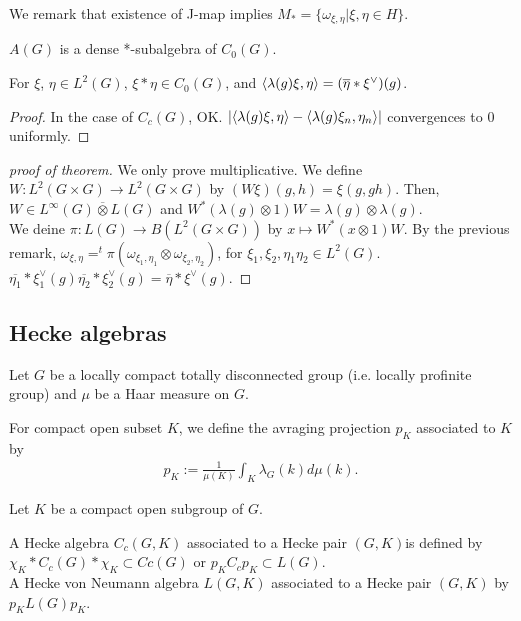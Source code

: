 We remark that existence of J-map implies $M_* = \{\omega_{\xi,\eta}|\xi, \eta \in H\}$.


\begin{theorem}
  $A(G)$ is a dense *-subalgebra of $C_0(G)$.
\end{theorem}

\begin{lemma}
  For $\xi$, $\eta \in L^2(G)$, $\xi*\eta \in C_0(G)$, and $\langle\lambda(g)\xi,\eta\rangle = (\overline{\eta}*\xi^{\vee})(g)$.
\end{lemma}

\begin{proof}
  In the case of $C_c(G)$, OK.
  $|\langle\lambda(g)\xi, \eta\rangle - \langle\lambda(g)\xi_n, \eta_n\rangle|$ convergences to $0$ uniformly.
\end{proof}

\begin{proof}[proof of theorem]
  We only prove multiplicative.
  We define $W: L^2(G \times G) \rightarrow L^2(G \times G)$ by $(W\xi)(g,h) = \xi(g,gh)$.
  Then, $W \in L^\infty(G) \overline{\otimes} L(G)$ and $W^*(\lambda(g) \otimes 1)W = \lambda(g)\otimes\lambda(g)$.\\
  We deine $\pi : L(G) \rightarrow B(L^2(G \times G))$ by $x \mapsto W^*(x\otimes1)W$.
  By the previous remark, $\omega_{\xi,\eta} = ^{t}\pi (\omega_{\xi_1,\eta_1}\otimes\omega_{\xi_2,\eta_2})$, for $\xi_1,\xi_2,\eta_1\eta_2 \in L^2(G)$.
  $\overline{\eta_1}*\xi_1^{\vee}(g)\overline{\eta_2}*\xi_2^{\vee}(g) = \overline{\eta}*\xi^{\vee}(g)$.
\end{proof}

\subsection{Hecke algebras}

Let $G$ be a locally compact totally disconnected group (i.e. locally profinite group) and $\mu$ be a Haar measure on $G$.

\begin{definition}
  For compact open subset $K$, we define the avraging projection $p_K$ associated to $K$ by
  \begin{align*}
    p_K := \frac{1}{\mu(K)} \int_K \lambda_G(k)d\mu(k).
  \end{align*}
\end{definition}

Let $K$ be a compact open subgroup of $G$. 

\begin{definition}
  A Hecke algebra $C_c(G,K)$ associated to a Hecke pair $(G,K)$is defined by $\chi_K * C_c(G) * \chi_K \subset Cc(G)$ or $p_KC_cp_K \subset L(G)$.\\
  A Hecke von Neumann algebra $L(G,K)$ associated to a Hecke pair $(G,K)$ by $p_KL(G)p_K$.
\end{definition}

